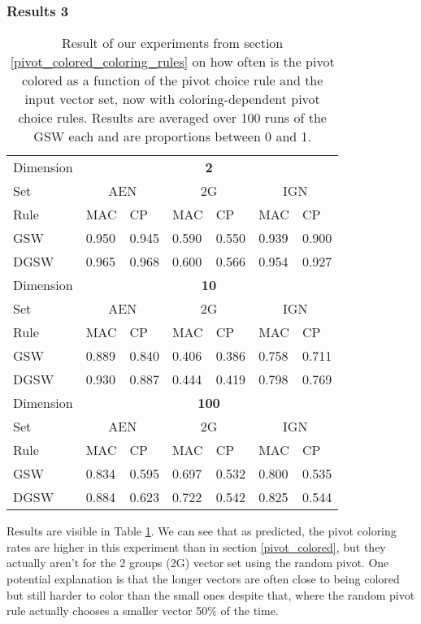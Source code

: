\documentclass[12pt]{article}
\begin{document}
\subsubsection{Results 3}
\begin{table}[h!]
\centering
\caption{Result of our experiments from section \ref{pivot_colored_coloring_rules} on how often is the pivot colored as a function of the pivot choice rule and the input vector set, now with coloring-dependent pivot choice rules. Results are averaged over 100 runs of the GSW each and are proportions between 0 and 1.}
\begin{tabular}{l|ll|ll|ll}
Dimension &\multicolumn{6}{c}{\textbf{2}}\\
Set  & \multicolumn{2}{c}{AEN} & \multicolumn{2}{c}{2G} & \multicolumn{2}{c}{IGN} \\
Rule &MAC&CP&MAC&CP&MAC&CP\\ \hline
GSW  &0.950&0.945&0.590&0.550&0.939&0.900\\
DGSW  &0.965&0.968&0.600&0.566&0.954&0.927\\
\hline
\hline
Dimension &\multicolumn{6}{c}{\textbf{10}}\\
Set  & \multicolumn{2}{c}{AEN} & \multicolumn{2}{c}{2G} & \multicolumn{2}{c}{IGN} \\
Rule &MAC&CP&MAC&CP&MAC&CP\\ \hline
GSW  &0.889&0.840&0.406&0.386&0.758&0.711\\
DGSW  &0.930&0.887&0.444&0.419&0.798&0.769\\
\hline
\hline
Dimension &\multicolumn{6}{c}{\textbf{100}}\\
Set  & \multicolumn{2}{c}{AEN} & \multicolumn{2}{c}{2G} & \multicolumn{2}{c}{IGN} \\
Rule &MAC&CP&MAC&CP&MAC&CP\\ \hline
GSW  &0.834&0.595&0.697&0.532&0.800&0.535\\
DGSW  &0.884&0.623&0.722&0.542&0.825&0.544\\
\end{tabular}
\label{pivot_colored_coloring_rules_results}
\end{table}

Results are visible in Table \ref{pivot_colored_coloring_rules_results}. We can see that as predicted, the pivot coloring rates are higher in this experiment than in section \ref{pivot_colored}, but they actually aren't for the 2 groups (2G) vector set using the random pivot. One potential explanation is that the longer vectors are often close to being colored but still harder to color than the small ones despite that, where the random pivot rule actually chooses a smaller vector 50\% of the time. 
\end{document}
